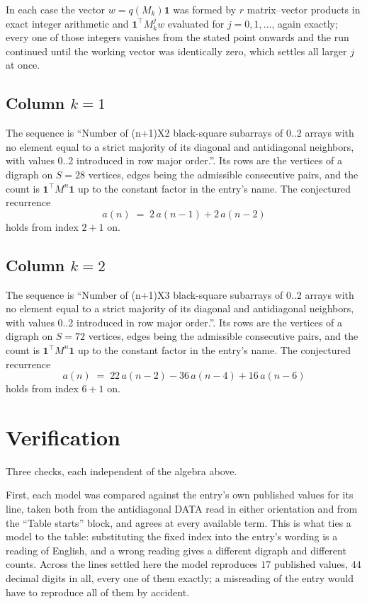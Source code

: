\documentclass[11pt,a4paper]{article}
\theoremstyle{plain}
\theoremstyle{definition}
\begin{document}
In each case the vector $w=q(M_k)\mathbf{1}$ was formed by $r$ matrix--vector products in
exact integer arithmetic and $\mathbf{1}^{\!\top}M_k^{j}w$ evaluated for $j=0,1,\dots$,
again exactly; every one of those integers vanishes from the stated point onwards and the run
continued until the working vector was identically zero, which settles all larger $j$ at once.

\subsection*{Column $k$$=1$}
The sequence is ``Number of (n+1)X2 black-square subarrays of 0..2 arrays with no element equal to a strict majority of its diagonal and antidiagonal neighbors, with values 0..2 introduced in row major order.''. Its rows are the vertices of a digraph on
$S=28$ vertices, edges being the admissible consecutive pairs, and the count is
$\mathbf{1}^{\!\top}M^{n}\mathbf{1}$ up to the constant factor in the entry's name.
The conjectured recurrence
\[
a(n)\;=\;2\,a(n-1) + 2\,a(n-2)
\]
holds from index $2+1$ on.

\subsection*{Column $k$$=2$}
The sequence is ``Number of (n+1)X3 black-square subarrays of 0..2 arrays with no element equal to a strict majority of its diagonal and antidiagonal neighbors, with values 0..2 introduced in row major order.''. Its rows are the vertices of a digraph on
$S=72$ vertices, edges being the admissible consecutive pairs, and the count is
$\mathbf{1}^{\!\top}M^{n}\mathbf{1}$ up to the constant factor in the entry's name.
The conjectured recurrence
\[
a(n)\;=\;22\,a(n-2) - 36\,a(n-4) + 16\,a(n-6)
\]
holds from index $6+1$ on.

\section{Verification}

Three checks, each independent of the algebra above.

First, each model was compared against the entry's own published values for its line, taken
both from the antidiagonal DATA read in either orientation and from the ``Table starts''
block, and agrees at every available term. This is what ties a model to the table:
substituting the fixed index into the entry's wording is a reading of English, and a wrong
reading gives a different digraph and different counts. Across the lines settled here the
model reproduces $17$ published values, $44$ decimal digits in all, every one of
them exactly; a misreading of the entry would have to reproduce all of them by accident.
\end{document}
